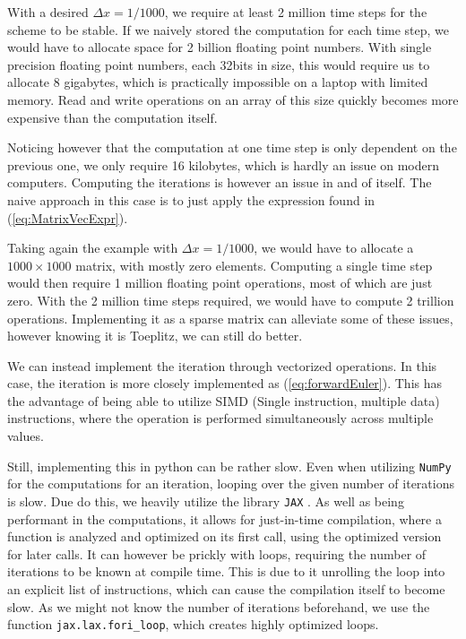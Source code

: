 \documentclass{article}
\theoremstyle{definition}
\begin{document}
With a desired $\Delta x = 1 / 1000$, we require at least 2 million time steps for the scheme to be stable. If we naively stored the computation for each time step, we would have to allocate space for 2 billion floating point numbers. With single precision floating point numbers, each 32bits in size, this would require us to allocate 8 gigabytes, which is practically impossible on a laptop with limited memory. Read and write operations on an array of this size quickly becomes more expensive than the computation itself.

Noticing however that the computation at one time step is only dependent on the previous one, we only require 16 kilobytes, which is hardly an issue on modern computers. Computing the iterations is however an issue in and of itself. The naive approach in this case is to just apply the expression found in (\ref{eq:MatrixVecExpr}).

Taking again the example with $\Delta x = 1 / 1000$, we would have to allocate a $1000 \times 1000$ matrix, with mostly zero elements. Computing a single time step would then require 1 million floating point operations, most of which are just zero. With the 2 million time steps required, we would have to compute 2 trillion operations. Implementing it as a sparse matrix can alleviate some of these issues, however knowing it is Toeplitz, we can still do better.

We can instead implement the iteration through vectorized operations. In this case, the iteration is more closely implemented as (\ref{eq:forwardEuler}). This has the advantage of being able to utilize SIMD (Single instruction, multiple data) instructions, where the operation is performed simultaneously across multiple values.

Still, implementing this in python can be rather slow. Even when utilizing \verb|NumPy| for the computations for an iteration, looping over the given number of iterations is slow. Due do this, we heavily utilize the library \verb|JAX| \parencite{jax2018github}. As well as being performant in the computations, it allows for just-in-time compilation, where a function is analyzed and optimized on its first call, using the optimized version for later calls. It can however be prickly with loops, requiring the number of iterations to be known at compile time. This is due to it unrolling the loop into an explicit list of instructions, which can cause the compilation itself to become slow. As we might not know the number of iterations beforehand, we use the function \verb|jax.lax.fori_loop|, which creates highly optimized loops.
\end{document}
